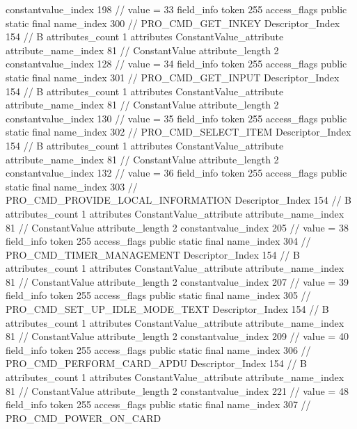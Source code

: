 {{{{{{{					constantvalue_index	198		// value = 33
				}
				}
			}
			field_info {
				token	255
				access_flags	public static final
				name_index	300		// PRO_CMD_GET_INKEY
				Descriptor_Index	154		// B
				attributes_count	1
				attributes {
				ConstantValue_attribute {
					attribute_name_index	81		// ConstantValue
					attribute_length	2
					constantvalue_index	128		// value = 34
				}
				}
			}
			field_info {
				token	255
				access_flags	public static final
				name_index	301		// PRO_CMD_GET_INPUT
				Descriptor_Index	154		// B
				attributes_count	1
				attributes {
				ConstantValue_attribute {
					attribute_name_index	81		// ConstantValue
					attribute_length	2
					constantvalue_index	130		// value = 35
				}
				}
			}
			field_info {
				token	255
				access_flags	public static final
				name_index	302		// PRO_CMD_SELECT_ITEM
				Descriptor_Index	154		// B
				attributes_count	1
				attributes {
				ConstantValue_attribute {
					attribute_name_index	81		// ConstantValue
					attribute_length	2
					constantvalue_index	132		// value = 36
				}
				}
			}
			field_info {
				token	255
				access_flags	public static final
				name_index	303		// PRO_CMD_PROVIDE_LOCAL_INFORMATION
				Descriptor_Index	154		// B
				attributes_count	1
				attributes {
				ConstantValue_attribute {
					attribute_name_index	81		// ConstantValue
					attribute_length	2
					constantvalue_index	205		// value = 38
				}
				}
			}
			field_info {
				token	255
				access_flags	public static final
				name_index	304		// PRO_CMD_TIMER_MANAGEMENT
				Descriptor_Index	154		// B
				attributes_count	1
				attributes {
				ConstantValue_attribute {
					attribute_name_index	81		// ConstantValue
					attribute_length	2
					constantvalue_index	207		// value = 39
				}
				}
			}
			field_info {
				token	255
				access_flags	public static final
				name_index	305		// PRO_CMD_SET_UP_IDLE_MODE_TEXT
				Descriptor_Index	154		// B
				attributes_count	1
				attributes {
				ConstantValue_attribute {
					attribute_name_index	81		// ConstantValue
					attribute_length	2
					constantvalue_index	209		// value = 40
				}
				}
			}
			field_info {
				token	255
				access_flags	public static final
				name_index	306		// PRO_CMD_PERFORM_CARD_APDU
				Descriptor_Index	154		// B
				attributes_count	1
				attributes {
				ConstantValue_attribute {
					attribute_name_index	81		// ConstantValue
					attribute_length	2
					constantvalue_index	221		// value = 48
				}
				}
			}
			field_info {
				token	255
				access_flags	public static final
				name_index	307		// PRO_CMD_POWER_ON_CARD
}}}}}

